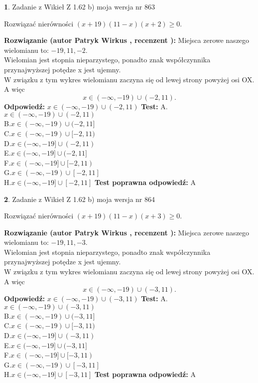 \documentclass[12pt, a4paper]{article}
\theoremstyle{definition} %
\newtheorem{zad}{}
\newcommand{\zadStart}[1]{\begin{zad}#1\newline}
\newcommand{\zadStop}{\end{zad}}
\newcommand{\rozwStart}[2]{\noindent \textbf{Rozwiązanie (autor #1 , recenzent #2): }\newline}
\newcommand{\rozwStop}{\newline}
\newcommand{\odpStart}{\noindent \textbf{Odpowiedź:}\newline}
\newcommand{\odpStop}{\newline}
\newcommand{\testStart}{\noindent \textbf{Test:}\newline}
\newcommand{\testStop}{\newline}
\newcommand{\kluczStart}{\noindent \textbf{Test poprawna odpowiedź:}\newline}
\newcommand{\kluczStop}{\newline}
\begin{document}
\zadStart{Zadanie z Wikieł Z 1.62 b) moja wersja nr 863}

Rozwiązać nierówności $(x+19)(11-x)(x+2)\ge0$.
\zadStop
\rozwStart{Patryk Wirkus}{}
Miejsca zerowe naszego wielomianu to: $-19, 11, -2$.\\
Wielomian jest stopnia nieparzystego, ponadto znak współczynnika przy\linebreak najwyższej potędze x jest ujemny.\\ W związku z tym wykres wielomianu zaczyna się od lewej strony powyżej osi OX. A więc $$x \in (-\infty,-19) \cup (-2,11).$$
\rozwStop
\odpStart
$x \in (-\infty,-19) \cup (-2,11)$
\odpStop
\testStart
A.$x \in (-\infty,-19) \cup (-2,11)$\\
B.$x \in (-\infty,-19) \cup (-2,11]$\\
C.$x \in (-\infty,-19) \cup [-2,11)$\\
D.$x \in (-\infty,-19] \cup (-2,11)$\\
E.$x \in (-\infty,-19] \cup (-2,11]$\\
F.$x \in (-\infty,-19] \cup [-2,11)$\\
G.$x \in (-\infty,-19) \cup [-2,11]$\\
H.$x \in (-\infty,-19] \cup [-2,11]$
\testStop
\kluczStart
A
\kluczStop



\zadStart{Zadanie z Wikieł Z 1.62 b) moja wersja nr 864}

Rozwiązać nierówności $(x+19)(11-x)(x+3)\ge0$.
\zadStop
\rozwStart{Patryk Wirkus}{}
Miejsca zerowe naszego wielomianu to: $-19, 11, -3$.\\
Wielomian jest stopnia nieparzystego, ponadto znak współczynnika przy\linebreak najwyższej potędze x jest ujemny.\\ W związku z tym wykres wielomianu zaczyna się od lewej strony powyżej osi OX. A więc $$x \in (-\infty,-19) \cup (-3,11).$$
\rozwStop
\odpStart
$x \in (-\infty,-19) \cup (-3,11)$
\odpStop
\testStart
A.$x \in (-\infty,-19) \cup (-3,11)$\\
B.$x \in (-\infty,-19) \cup (-3,11]$\\
C.$x \in (-\infty,-19) \cup [-3,11)$\\
D.$x \in (-\infty,-19] \cup (-3,11)$\\
E.$x \in (-\infty,-19] \cup (-3,11]$\\
F.$x \in (-\infty,-19] \cup [-3,11)$\\
G.$x \in (-\infty,-19) \cup [-3,11]$\\
H.$x \in (-\infty,-19] \cup [-3,11]$
\testStop
\kluczStart
A
\kluczStop
\end{document}

